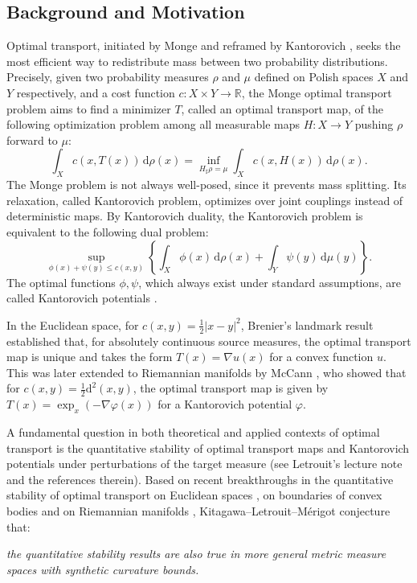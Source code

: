 \documentclass[a4paper,11pt]{article}
\numberwithin{equation}{section}
\theoremstyle{plain}
\theoremstyle{definition}
\theoremstyle{remark}
\newcommand{\R}{\mathbb{R}}
\renewcommand{\d}{{\mathrm d}}
\begin{document}
	\subsection{Background and Motivation}
	Optimal transport, initiated by Monge  \cite{monge1781} and reframed by  Kantorovich \cite{zbMATH03099866},  seeks the most efficient way to redistribute mass between two probability distributions.   Precisely, given two probability measures $\rho$ and $\mu$ defined on Polish spaces $X$ and $Y$ respectively, and a  cost function $c:X\times Y\rightarrow \R$, the Monge optimal transport problem aims to find a minimizer  $T$,   called an optimal transport map,   of the following optimization problem among all measurable maps $H: X \to Y$ pushing $\rho$ forward to $\mu$:
	\begin{equation}\label{2.1}
		\int_X c(x, T(x))  \,\d\rho(x)=\inf_{H_\sharp \rho = \mu}\int_X c(x, H(x))  \,\d\rho(x). \tag{MP}
	\end{equation}
 The   Monge problem is not always well-posed,   since it  prevents mass splitting.    Its relaxation,  called Kantorovich problem, optimizes over joint couplings instead of deterministic maps. By Kantorovich duality,   the Kantorovich problem is equivalent to the  following dual problem:
	\begin{equation}
		\sup_{ \phi(x) + \psi(y) \leq c(x, y)} \left\{ \int_X \phi(x) \, \d\rho(x) + \int_Y \psi(y) \, \d\mu(y)  \right\}.\tag{KD}
	\end{equation}
	The optimal functions $\phi,\psi$,  which always exist under standard assumptions,   are called  Kantorovich potentials \cite{AG-U, V-O}.  
	
	In the Euclidean space,   for $c(x,y)=\frac{1}{2}|x-y|^2$, Brenier's landmark result \cite{brenier1991polar} established that, for absolutely continuous source measures, the optimal transport map is unique and takes the form $T(x)=\nabla u(x)$ for a convex function $u$. This was later extended to Riemannian manifolds by McCann \cite{mccann2001polar}, who showed that for $c(x,y)=\frac{1}{2}\d^2(x,y)$, the optimal transport map is given by $T(x)=\exp_x(-\nabla\varphi(x))$ for a  Kantorovich potential $\varphi$.
	
	 A fundamental question in both theoretical and applied contexts of optimal transport is the quantitative stability of optimal transport maps and Kantorovich potentials under perturbations of the target measure (see Letrouit's lecture note \cite{LetrouitLecture} and the references therein).   Based on recent breakthroughs in the quantitative stability of optimal transport  on  Euclidean spaces \cite{zbMATH07794624, arXiv:2411.04908},    on boundaries of convex bodies \cite{Kitagawa12,  Kitagawa25}  and  on Riemannian manifolds  \cite{arXiv:2504.05412},     
Kitagawa--Letrouit--M\'erigot   \cite[\S 1.2]{arXiv:2504.05412} conjecture that:
	\begin{center}
		\emph{the quantitative stability results are also true in more general metric measure spaces with synthetic curvature bounds.}
	\end{center}
	
\end{document}
